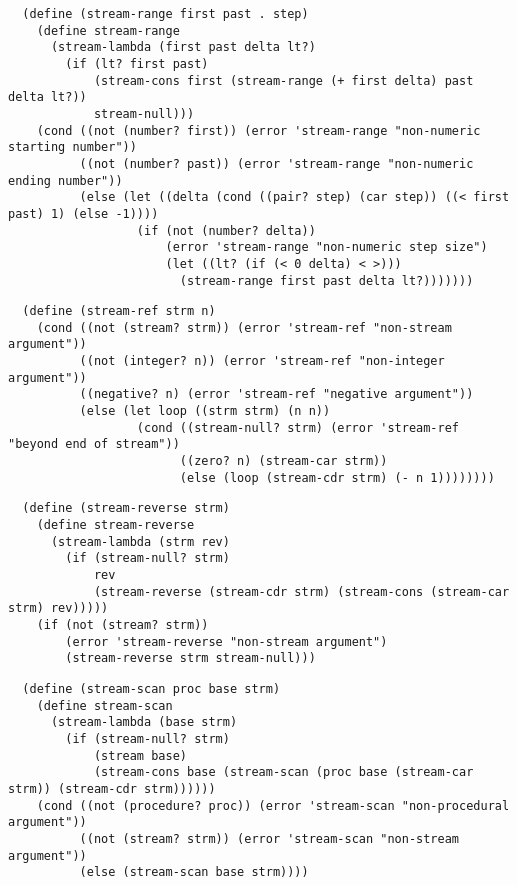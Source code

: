 \begin{verbatim}
  (define (stream-range first past . step)
    (define stream-range
      (stream-lambda (first past delta lt?)
        (if (lt? first past)
            (stream-cons first (stream-range (+ first delta) past delta lt?))
            stream-null)))
    (cond ((not (number? first)) (error 'stream-range "non-numeric starting number"))
          ((not (number? past)) (error 'stream-range "non-numeric ending number"))
          (else (let ((delta (cond ((pair? step) (car step)) ((< first past) 1) (else -1))))
                  (if (not (number? delta))
                      (error 'stream-range "non-numeric step size")
                      (let ((lt? (if (< 0 delta) < >)))
                        (stream-range first past delta lt?)))))))
\end{verbatim}

\begin{verbatim}
  (define (stream-ref strm n)
    (cond ((not (stream? strm)) (error 'stream-ref "non-stream argument"))
          ((not (integer? n)) (error 'stream-ref "non-integer argument"))
          ((negative? n) (error 'stream-ref "negative argument"))
          (else (let loop ((strm strm) (n n))
                  (cond ((stream-null? strm) (error 'stream-ref "beyond end of stream"))
                        ((zero? n) (stream-car strm))
                        (else (loop (stream-cdr strm) (- n 1))))))))
\end{verbatim}

\begin{verbatim}
  (define (stream-reverse strm)
    (define stream-reverse
      (stream-lambda (strm rev)
        (if (stream-null? strm)
            rev
            (stream-reverse (stream-cdr strm) (stream-cons (stream-car strm) rev)))))
    (if (not (stream? strm))
        (error 'stream-reverse "non-stream argument")
        (stream-reverse strm stream-null)))
\end{verbatim}

\begin{verbatim}
  (define (stream-scan proc base strm)
    (define stream-scan
      (stream-lambda (base strm)
        (if (stream-null? strm)
            (stream base)
            (stream-cons base (stream-scan (proc base (stream-car strm)) (stream-cdr strm))))))
    (cond ((not (procedure? proc)) (error 'stream-scan "non-procedural argument"))
          ((not (stream? strm)) (error 'stream-scan "non-stream argument"))
          (else (stream-scan base strm))))
\end{verbatim}


